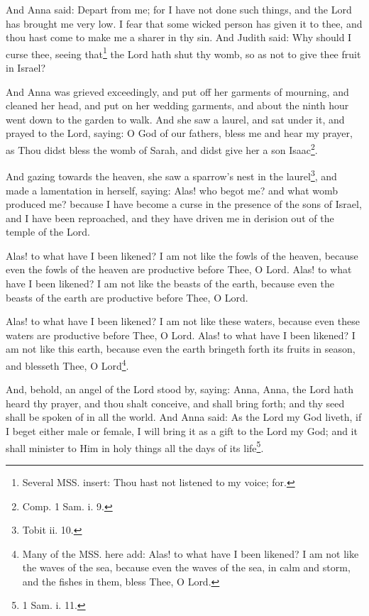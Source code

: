 \pend\pstart
And Anna said: Depart from me; for I have not done such things, and the Lord has brought me very low. I fear that some wicked person has given it to thee, and thou hast come to make me a sharer in thy sin. And Judith said: Why should I curse thee, seeing that\footnote{Several MSS. insert: Thou hast not listened to my voice; for.} the Lord hath shut thy womb, so as not to give thee fruit in Israel?

\pend\pstart
And Anna was grieved exceedingly, and put off her garments of mourning, and cleaned her head, and put on her wedding garments, and about the ninth hour went down to the garden to walk. And she saw a laurel, and sat under it, and prayed to the Lord, saying: O God of our fathers, bless me and hear my prayer, as Thou didst bless the womb of Sarah, and didst give her a son Isaac\footnote{Comp. 1 Sam. i. 9.}.

\pend\pstart
{}

\pend\pstart
And gazing towards the heaven, she saw a sparrow's nest in the laurel\footnote{Tobit ii. 10.}, and made a lamentation in herself, saying: Alas! who begot me? and what womb produced me? because I have become a curse in the presence of the sons of Israel, and I have been reproached, and they have driven me in derision out of the temple of the Lord.

\pend\pstart
Alas! to what have I been likened? I am not like the fowls of the heaven, because even the fowls of the heaven are productive before Thee, O Lord. Alas! to what have I been likened? I am not like the beasts of the earth, because even the beasts of the earth are productive before Thee, O Lord.

\pend\pstart
Alas! to what have I been likened? I am not like these waters, because even these waters are productive before Thee, O Lord. Alas! to what have I been likened? I am not like this earth, because even the earth bringeth forth its fruits in season, and blesseth Thee, O Lord\footnote{Many of the MSS. here add: Alas! to what have I been likened? I am not like the waves of the sea, because even the waves of the sea, in calm and storm, and the fishes in them, bless Thee, O Lord.}.

\pend\pstart
{}

\pend\pstart
And, behold, an angel of the Lord stood by, saying: Anna, Anna, the Lord hath heard thy prayer, and thou shalt conceive, and shall bring forth; and thy seed shall be spoken of in all the world. And Anna said: As the Lord my God liveth, if I beget either male or female, I will bring it as a gift to the Lord my God; and it shall minister to Him in holy things all the days of its life\footnote{1 Sam. i. 11.}.

